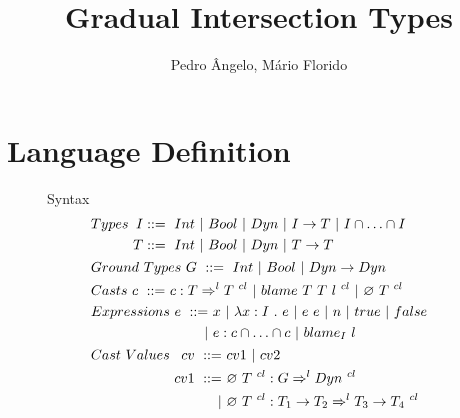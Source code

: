 \documentclass[a4paper]{article}
\begin{document}
\title{Gradual Intersection Types}

\author{Pedro Ângelo, Mário Florido}

\maketitle
{}

\section{Language Definition}
\begin{figure}[H]
Syntax
\begin{align*}
&Types\ \begin{aligned}[t] I &::=\ \Int\ |\ \Bool\ |\ \Dyn\ |\ I \rightarrow T\ |\ I \cap \ldots \cap I\\
                          T &::=\ \Int\ |\ \Bool\ |\ \Dyn\ |\ T \rightarrow T \end{aligned}\\
&Ground\ Types\ G\ ::=\ \Int\ |\ \Bool\ |\ \Dyn \rightarrow \Dyn\\
&Casts\ \begin{aligned}[t] c\ ::=&\ c : T \Rightarrow^l T\ ^{cl}\ |\ \blamecast{T}{T}{l}{cl}\ |\ \emptycast{T}{cl} \end{aligned}\\
&Expressions\ \begin{aligned}[t] e\ ::=&\ x\ |\ \lambda x : I\ .\ e\ |\ e\ e\ |\ n\ |\ \true\ |\ \false\\
                                      |&\ e : c \cap \ldots \cap c\ |\ \blame{I}{l} \end{aligned}\\
&Cast\ Values\ \begin{aligned}[t] cv\ ::=&\ cv1\ |\ cv2\\
                                cv1\ ::=&\ \emptycast{T}{cl} : G \Rightarrow^l \Dyn\ ^{cl}\\
                                       |&\ \emptycast{T}{cl} : T_1 \rightarrow T_2 \Rightarrow^l T_3 \rightarrow T_4\ ^{cl}\\

\end{aligned}
\end{align*}
\end{figure}
\end{document}
